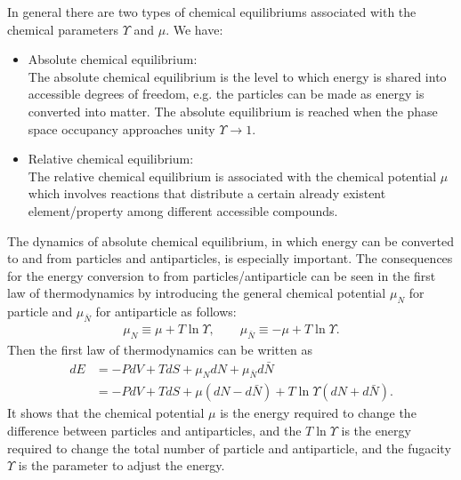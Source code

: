 In general there are two types of chemical equilibriums associated with the chemical parameters $\Upsilon$ and $\mu$. We have:
\begin{itemize}
\item Absolute chemical equilibrium:\\
The absolute chemical equilibrium is the level to which energy is shared into accessible degrees of freedom, e.g. the particles can be made as energy is converted into matter.
The absolute equilibrium is reached when the phase space occupancy approaches unity $\Upsilon\to1$. 
 \item Relative chemical equilibrium:\\
 The relative chemical equilibrium is associated with the chemical potential $\mu$ which involves reactions that distribute a certain already existent element/property among different accessible compounds. 
 \end{itemize}
The dynamics of absolute chemical equilibrium, in which energy can be converted to and from particles and antiparticles, is especially important. The consequences for the energy conversion to from particles/antiparticle can be seen in the first law of thermodynamics by introducing the general chemical potential $\mu_N$ for particle and $\mu_{\bar{N}}$ for antiparticle as follows:
\begin{align}
\mu_N\equiv\mu+T\ln\Upsilon,\qquad{\mu_{\bar{N}}}\equiv{-\mu}+T\ln\Upsilon.
\end{align}
Then the first law of thermodynamics can be written as
\begin{align}
dE&=-PdV+TdS+{\mu_N}dN+{\mu_{\bar{N}}}d{\bar{N}}
\\&=-PdV+TdS+{\mu}(dN-d{\bar{N}})+T\ln{\Upsilon}(dN+d{\bar{N}}).
\end{align}
It shows that the chemical potential $\mu$ is the energy required to change the difference between particles and antiparticles, and the $T\ln\Upsilon$ is the energy required to change the total number of particle and antiparticle, and the fugacity $\Upsilon$ is the parameter to adjust the energy.


